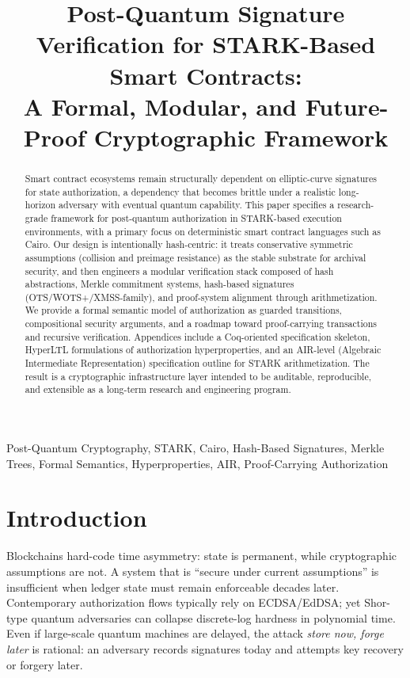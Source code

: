 \documentclass[conference]{IEEEtran}
\title{Post-Quantum Signature Verification for STARK-Based Smart Contracts:\\
A Formal, Modular, and Future-Proof Cryptographic Framework}
\author{
\IEEEauthorblockN{Mayckon Giovani}
\IEEEauthorblockA{Principal Systems Engineer\\
Specializing in Post-Quantum Cryptography and Infrastructure\\
Email: \texttt{contact@mayckongiovani.xyz}}
}
\theoremstyle{definition}
\theoremstyle{plain}
\theoremstyle{remark}
\begin{document}
\maketitle

\begin{abstract}
Smart contract ecosystems remain structurally dependent on elliptic-curve signatures for state authorization, a dependency that becomes brittle under a realistic long-horizon adversary with eventual quantum capability. This paper specifies a research-grade framework for post-quantum authorization in STARK-based execution environments, with a primary focus on deterministic smart contract languages such as Cairo. Our design is intentionally hash-centric: it treats conservative symmetric assumptions (collision and preimage resistance) as the stable substrate for archival security, and then engineers a modular verification stack composed of hash abstractions, Merkle commitment systems, hash-based signatures (OTS/WOTS+/XMSS-family), and proof-system alignment through arithmetization.
We provide a formal semantic model of authorization as guarded transitions, compositional security arguments, and a roadmap toward proof-carrying transactions and recursive verification. Appendices include a Coq-oriented specification skeleton, HyperLTL formulations of authorization hyperproperties, and an AIR-level (Algebraic Intermediate Representation) specification outline for STARK arithmetization. The result is a cryptographic infrastructure layer intended to be auditable, reproducible, and extensible as a long-term research and engineering program.
\end{abstract}

\begin{IEEEkeywords}
Post-Quantum Cryptography, STARK, Cairo, Hash-Based Signatures, Merkle Trees, Formal Semantics, Hyperproperties, AIR, Proof-Carrying Authorization
\end{IEEEkeywords}

\section{Introduction}
Blockchains hard-code time asymmetry: state is permanent, while cryptographic assumptions are not. A system that is ``secure under current assumptions'' is insufficient when ledger state must remain enforceable decades later. Contemporary authorization flows typically rely on ECDSA/EdDSA; yet Shor-type quantum adversaries can collapse discrete-log hardness in polynomial time. Even if large-scale quantum machines are delayed, the attack \emph{store now, forge later} is rational: an adversary records signatures today and attempts key recovery or forgery later.
\end{document}
